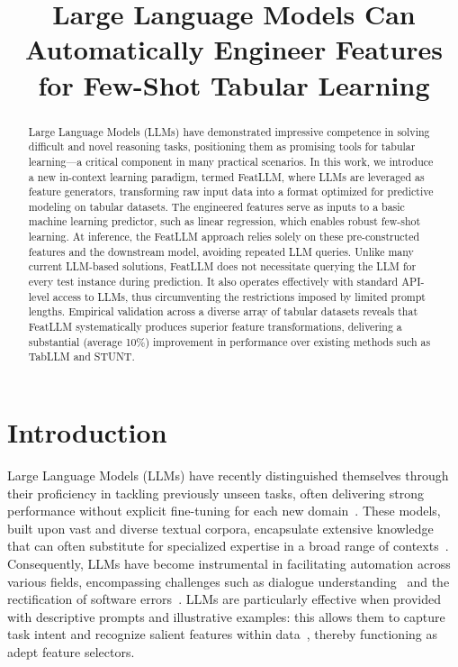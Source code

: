 \title{Large Language Models Can Automatically Engineer Features for Few-Shot Tabular Learning}

\begin{abstract}
Large Language Models (LLMs) have demonstrated impressive competence in solving difficult and novel reasoning tasks, positioning them as promising tools for tabular learning—a critical component in many practical scenarios. In this work, we introduce a new in-context learning paradigm, termed \textsf{FeatLLM}, where LLMs are leveraged as feature generators, transforming raw input data into a format optimized for predictive modeling on tabular datasets. The engineered features serve as inputs to a basic machine learning predictor, such as linear regression, which enables robust few-shot learning. At inference, the \textsf{FeatLLM} approach relies solely on these pre-constructed features and the downstream model, avoiding repeated LLM queries. Unlike many current LLM-based solutions, \textsf{FeatLLM} does not necessitate querying the LLM for every test instance during prediction. It also operates effectively with standard API-level access to LLMs, thus circumventing the restrictions imposed by limited prompt lengths. Empirical validation across a diverse array of tabular datasets reveals that \textsf{FeatLLM} systematically produces superior feature transformations, delivering a substantial (average 10\%) improvement in performance over existing methods such as TabLLM and STUNT.
\end{abstract}

\section{Introduction}
Large Language Models (LLMs) have recently distinguished themselves through their proficiency in tackling previously unseen tasks, often delivering strong performance without explicit fine-tuning for each new domain~\cite{creswell2022selection,imani2023mathprompter,taylor2022galactica}. These models, built upon vast and diverse textual corpora, encapsulate extensive knowledge that can often substitute for specialized expertise in a broad range of contexts~\cite{Genomes2021,singhal2023large,wilcox2003role}. Consequently, LLMs have become instrumental in facilitating automation across various fields, encompassing challenges such as dialogue understanding~\cite{finch2023leveraging} and the rectification of software errors~\cite{fan2023automated}. LLMs are particularly effective when provided with descriptive prompts and illustrative examples: this allows them to capture task intent and recognize salient features within data~\cite{brown2020language,zhao2023survey}, thereby functioning as adept feature selectors.

